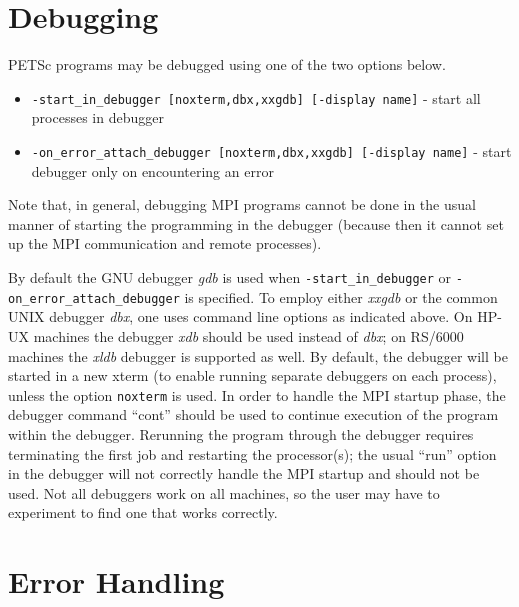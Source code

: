 \section{Debugging}  \label{sec:debugging}

PETSc programs may be debugged using one of the two options below.
\begin{itemize}
\item {\tt -start\_in\_debugger [noxterm,dbx,xxgdb] [-display name]} 
     - start all processes in debugger
\item {\tt -on\_error\_attach\_debugger [noxterm,dbx,xxgdb]
      [-display name]} - start debugger only on encountering an error
\end{itemize}
Note that, in general, debugging MPI programs cannot be done in the usual
manner of starting the programming in the debugger (because then it cannot
set up the MPI communication and remote processes).

By default the GNU debugger {\em gdb} is used when {\tt -start\_in\_debugger}
or {\tt -on\_error\_attach\_debugger} is specified. 
To employ either {\em xxgdb} or the common UNIX debugger {\em dbx}, one uses
command line options as indicated above. On HP-UX machines the debugger
{\em xdb} should be used instead of {\em dbx}; on RS/6000 machines the
{\em xldb} debugger is supported as well.
By  default, the debugger will be started in a new xterm (to enable 
running separate debuggers on each process), unless the option 
{\tt noxterm} is used.
In order to handle the MPI startup phase, the debugger command ``cont'' 
should be used to continue execution of the program within the debugger.
Rerunning the program through the debugger requires terminating 
the first job and restarting the processor(s); the usual ``run'' 
option in the debugger will not correctly handle the MPI startup and
should not be used.  Not all debuggers work on all machines, so the user
may have to experiment to find one that works correctly.

\section{Error Handling}   

